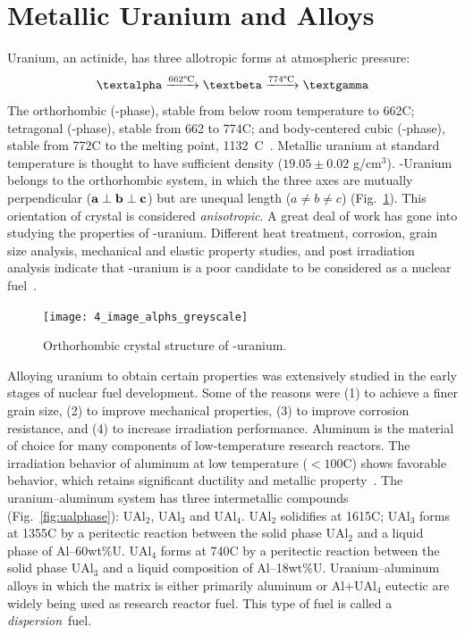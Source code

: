 \section{Metallic Uranium and Alloys}
Uranium, an actinide, has three allotropic forms at atmospheric pressure:
$$
\ce{\text{\textalpha} ->[$662\text{\textdegree C}$] $\text{\textbeta}$ ->[$774\text{\textdegree C}$] $\text{\textgamma}$ }
$$
The orthorhombic (\textalpha-phase), stable from below room temperature to 662\textdegree C; tetragonal (\textbeta-phase), stable from 662 to 774\textdegree C; and body-centered cubic (\textgamma-phase), stable from 772\textdegree C to the melting point, 1132~\textdegree C~\cite{kaufmann1962nuclear}. Metallic uranium at standard temperature is thought to have sufficient density ($19.05\pm0.02$ g/cm$^3$)\@. \textalpha-Uranium belongs to the orthorhombic system, in which the three axes are mutually perpendicular ($\vb{a}\perp \vb{b}\perp \vb{c}$) but are unequal length ($a\ne b\ne c$) (Fig.~\ref{fig_alphu})\@. This orientation of crystal is considered \textit{anisotropic}. A great deal of work has gone into studying the properties of \textalpha-uranium. Different heat treatment, corrosion, grain size analysis, mechanical and elastic property studies, and post irradiation analysis indicate that \textalpha-uranium is a poor candidate to be considered as a nuclear fuel~\cite{pugh1961swelling, loomis1962swelling, chiswik1958osti}.

\begin{figure}
\centering
\texttt{[image: 4\_image\_alphs\_greyscale]}
\caption{Orthorhombic crystal structure of \textalpha-uranium.}
\label{fig_alphu}
\end{figure}


Alloying uranium to obtain certain properties was extensively studied in the early stages of nuclear fuel development. Some of the reasons were (1) to achieve a finer grain size, (2) to improve mechanical properties, (3) to improve corrosion resistance, and (4) to increase irradiation performance. Aluminum is the material of choice for many components of low-temperature research reactors. The irradiation behavior of aluminum at low temperature ($< 100$\textdegree C) shows favorable behavior, which retains significant ductility and metallic property~\cite{farrell2012}. The uranium--aluminum system has three intermetallic compounds (Fig.~\ref{fig:ualphase}): UAl$_2$, UAl$_3$ and UAl$_4$. UAl$_2$ solidifies at 1615\textdegree C; UAl$_3$ forms at 1355\textdegree C by a peritectic reaction between the solid phase UAl$_2$ and a liquid phase of Al--60wt\%U\@. UAl$_4$ forms at 740\textdegree C by a peritectic reaction between the solid phase UAl$_3$ and a liquid composition of Al--18wt\%U\@. Uranium--aluminum alloys in which the matrix is either primarily aluminum or Al+UAl$_4$ eutectic are widely being used as research reactor fuel. This type of fuel is called a \textit{dispersion}\footnotemark\ fuel.

